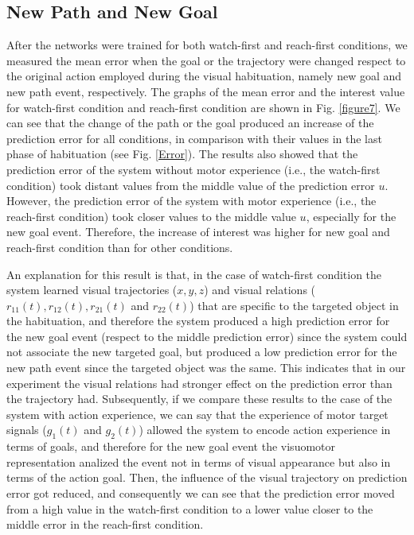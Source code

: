 \documentclass[conference]{IEEEtran}
\begin{document}
\subsection{New Path and New Goal}
After the networks were trained for both watch-first and reach-first conditions, we measured the mean error when the goal or the trajectory were changed respect to the original action employed during the visual habituation, namely new goal and new path event, respectively. The graphs of the mean error and the interest value for watch-first condition and reach-first condition are shown in Fig. \ref{figure7}. We can see that the change of the path or the goal produced an increase of the prediction error for all conditions, in comparison with their values in the last phase of habituation (see Fig. \ref{Error}). The results also showed that the prediction error of the system without motor experience (i.e., the watch-first condition) took distant values from the middle value of the prediction error \(\textit{u}\). However, the prediction error of the system with motor experience (i.e., the reach-first condition) took closer values to the middle value \(\textit{u}\), especially for the new goal event. Therefore, the increase of interest was higher for new goal and reach-first condition than for other conditions. 

An explanation for this result is that, in the case of watch-first condition the system learned visual trajectories ($x,y,z$) and visual relations ($r_{11}(t), r_{12}(t), r_{21}(t)$ and $r_{22}(t)$) that are specific to the targeted object in the habituation, and therefore the system produced a high prediction error for the new goal event (respect to the middle prediction error) since the system could not associate the new targeted goal, but produced a low prediction error for the new path event since the targeted object was the same. This indicates that in our experiment the visual relations had stronger effect on the prediction error than the trajectory had. Subsequently, if we compare these results to the case of the system with action experience, we can say that the experience of motor target signals ($g_{1}(t)$ and $g_{2}(t)$) allowed the system to encode action experience in terms of goals, and therefore for the new goal event the visuomotor representation analized the event not in terms of visual appearance but also in terms of the action goal. Then, the influence of the visual trajectory on prediction error got reduced, and consequently we can see that the prediction error moved from a high value in the watch-first condition to a lower value closer to the middle error in the reach-first condition.
\end{document}
